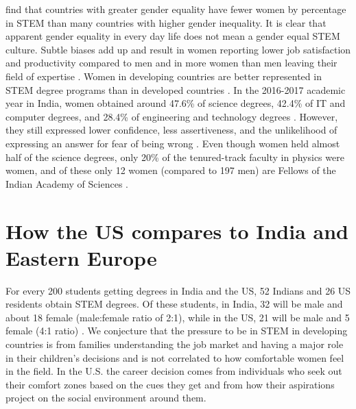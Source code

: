 \documentclass[utf8]{frontiersSCNS} %
\begin{document}
  \cite{stoet2018gender} find that countries with greater gender equality have fewer women by percentage in STEM than many countries with higher gender inequality. It is clear that apparent gender equality in every day life does not mean a gender equal STEM culture.  Subtle biases add up and result in women reporting lower job satisfaction and productivity compared to men and in more women than men leaving their field of expertise \citep{settles2014women}. Women in developing countries are better represented in STEM degree programs than in developed countries \citep{India2017}.  In the 2016-2017 academic year in India, women obtained around 47.6\% of science degrees, 42.4\% of IT and computer degrees, and 28.4\% of engineering and technology degrees \citep{India2017}.  However, they still expressed lower confidence, less assertiveness, and the unlikelihood of expressing an answer for fear of being wrong \citep{Yardi}. Even though women held almost half of the science degrees, only 20\% of the tenured-track faculty in physics were women, and of these only 12 women (compared to 197 men) are Fellows of the Indian Academy of Sciences  \citep{WiredIndiaFaculty}.


\section{How the US compares to India and Eastern Europe}
\label{Sec4}
For every 200 students getting degrees in India and the US, 52 Indians and 26 US residents obtain STEM degrees. Of these students, in India, 32 will be male and about 18 female (male:female ratio of 2:1), while in the US, 21 will be male and 5 female (4:1 ratio) \citep{STEMDegreesByCountry}. We conjecture that the pressure to be in STEM in developing countries is from families understanding the job market and having a major role in their children’s decisions and is not correlated to how comfortable women feel in the field. In the U.S. the career decision comes from individuals who seek out their comfort zones based on the cues they get and from how their aspirations project on the social environment around them. 
\end{document}
